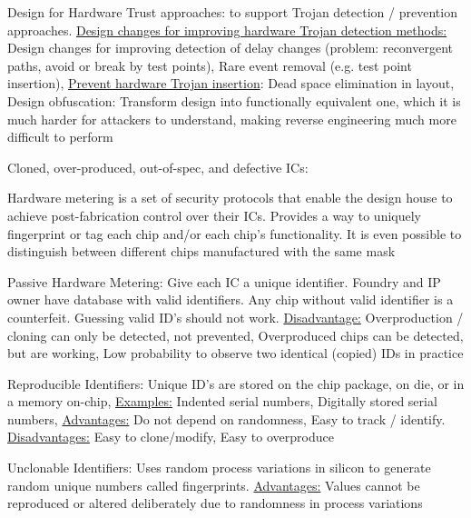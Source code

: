 \documentclass[landscape, a4paper]{article}
\begin{document}
\begin{minipage}[t]{0.2\linewidth}
\begin{betterlist}
\begin{betterlist}
\begin{betterlist}
\begin{betterlist}
\begin{betterlist}
					\end{betterlist}
					\item \alert{Design for Hardware Trust approaches:} to support Trojan detection / prevention approaches. \underline{Design changes for improving hardware Trojan detection methods:} \alert{Design changes for improving detection of delay changes} (problem: reconvergent paths, avoid or break by test points), \alert{Rare event removal} (e.g. test point insertion), \underline{Prevent hardware Trojan insertion}: \alert{Dead space elimination in layout}, \alert{Design obfuscation:} Transform design into functionally equivalent one, which it is much harder for attackers to understand, making reverse engineering much more difficult to perform
				\end{betterlist}
			\end{betterlist}
		\end{betterlist}
		\item \alert{Cloned, over-produced, out-of-spec, and defective ICs:}
		\begin{betterlist}
			\item \alert{Hardware metering} is a set of security protocols that enable the design house to achieve post-fabrication control over their ICs.  Provides a way to uniquely fingerprint or tag each chip and/or each chip’s functionality. It is even possible to distinguish between different chips manufactured with the same mask
			\item \alert{Passive Hardware Metering:} Give each IC a unique identifier. Foundry and IP owner have database with valid identifiers. Any chip without valid identifier is a counterfeit. Guessing valid ID's should not work. \underline{Disadvantage:} Overproduction / cloning can only be detected, not prevented, Overproduced chips can be detected, but are working, Low probability to observe two identical (copied) IDs in practice
			\begin{betterlist}
				\item \alert{Reproducible Identifiers:} Unique ID’s are stored on the chip package, on die, or in a memory on-chip, \underline{Examples:} Indented serial numbers, Digitally stored serial numbers, \underline{Advantages:} Do not depend on randomness, Easy to track / identify. \underline{Disadvantages:} Easy to clone/modify, Easy to overproduce
				\item \alert{Unclonable Identifiers:} Uses random process variations in silicon to generate random unique numbers called \alert{fingerprints}. \underline{Advantages:} Values cannot be reproduced or altered deliberately due to randomness in process variations

\end{betterlist}
\end{betterlist}
\end{betterlist}
\end{minipage}
\end{document}

